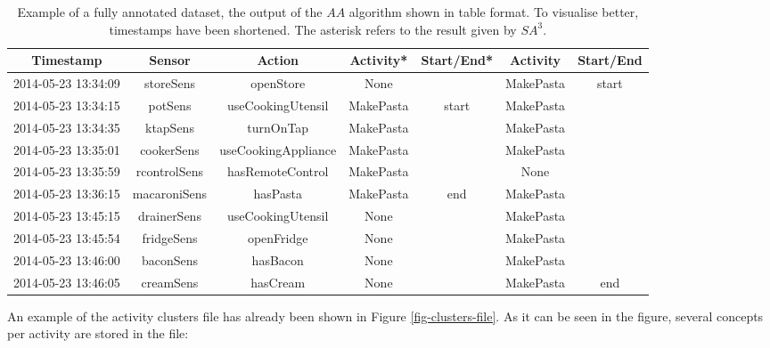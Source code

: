 \begin{table}[htbp]\scriptsize
  \begin{center}
        \begin{tabular}{ccccccc}
            \hline            
            Timestamp & Sensor & Action & Activity* & Start/End* & Activity & Start/End \\             
            \hline
            2014-05-23 13:34:09 & storeSens & openStore & None &  & MakePasta & start \\
2014-05-23 13:34:15 & potSens & useCookingUtensil & MakePasta & start & MakePasta &  \\
2014-05-23 13:34:35 & ktapSens & turnOnTap & MakePasta &  & MakePasta &  \\
2014-05-23 13:35:01 & cookerSens & useCookingAppliance & MakePasta &  & MakePasta &  \\
2014-05-23 13:35:59 & rcontrolSens & hasRemoteControl & MakePasta &  & None &  \\
2014-05-23 13:36:15 & macaroniSens & hasPasta & MakePasta & end & MakePasta &  \\
2014-05-23 13:45:15 & drainerSens & useCookingUtensil & None &  & MakePasta &  \\
2014-05-23 13:45:54 & fridgeSens & openFridge & None &  & MakePasta &  \\
2014-05-23 13:46:00 & baconSens & hasBacon & None &  & MakePasta &  \\
2014-05-23 13:46:05 & creamSens & hasCream & None &  & MakePasta & end \\
            \hline
        \end{tabular}                
        \caption{Example of a fully annotated dataset, the output of the $AA$ algorithm shown in table format. To visualise better, timestamps have been shortened. The asterisk refers to the result given by $SA^3$.}
        \label{tab-fully-annotated}
    \end{center}
\end{table}

An example of the activity clusters file has already been shown in Figure \ref{fig-clusters-file}. As it can be seen in the figure, several concepts per activity are stored in the file:

